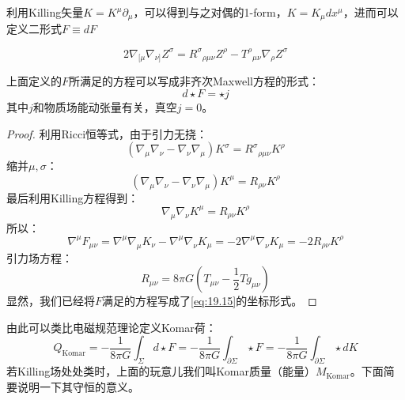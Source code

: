 利用Killing矢量$K=K^\mu\partial_\mu$，可以得到与之对偶的1\mbox{-}form，$K=K_\mu dx^\mu$，进而可以定义二形式$F\equiv dF$
\begin{lemma}
	\begin{equation}
		2\nabla_{[\mu}\nabla_{\nu]}Z^\sigma={R^\sigma}_{\rho\mu\nu}Z^\rho-T^\rho{}_{\mu\nu}\nabla_\rho Z^\sigma 
	\end{equation}
\end{lemma}
\begin{theorem}
	上面定义的$F$所满足的方程可以写成非齐次Maxwell方程的形式：
	\begin{equation}\label{eq:19.15}
		d\star F=\star j
	\end{equation}
	其中$j$和物质场能动张量有关，真空$j=0$。
\end{theorem}
\begin{proof}
	利用Ricci恒等式，由于引力无挠：
	\[(\nabla_{\mu}\nabla_{\nu}-\nabla_{\nu}\nabla_{\mu})K^{\sigma}={R^{\sigma}}_{\rho\mu\nu}K^{\rho}\]
	缩并$\mu,\sigma$：
	\[(\nabla_\mu\nabla_\nu-\nabla_\nu\nabla_\mu)K^\mu=R_{\rho\nu}K^\rho \]
	最后利用Killing方程得到：
	\[\nabla_\mu\nabla_\nu K^\mu=R_{\rho\nu}K^\rho \]
	所以：
	\[\nabla^\mu F_{\mu\nu}=\nabla^\mu\nabla_\mu K_\nu-\nabla^\mu\nabla_\nu K_\mu=-2\nabla^\mu\nabla_\nu K_\mu=-2R_{\rho\nu}K^\rho \]
	引力场方程：
	\[R_{\mu\nu}=8\pi G\left(T_{\mu\nu}-\frac12Tg_{\mu\nu}\right)\]
	显然，我们已经将$F$满足的方程写成了\ref{eq:19.15}的坐标形式。
\end{proof}
由此可以类比电磁规范理论定义Komar荷：
\begin{equation}
	\boxed{
	Q_\text{Komar}=-\frac{1}{8\pi G}\int_{\Sigma}d\star F=-\frac{1}{8\pi G}\int_{\partial\Sigma}\star F=-\frac{1}{8\pi G}\int_{\partial\Sigma}\star dK
	}
\end{equation}
若Killing场处处类时，上面的玩意儿我们叫Komar质量（能量）$M_{\text{Komar}}$。下面简要说明一下其守恒的意义。

